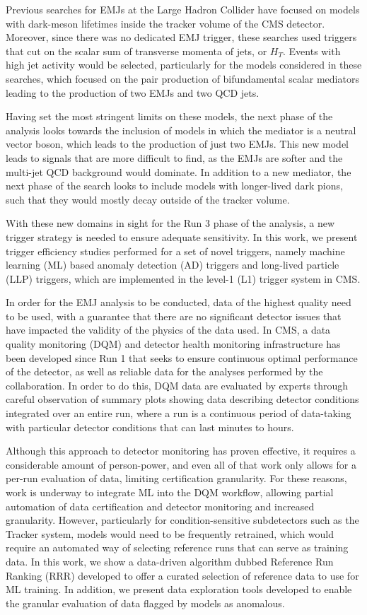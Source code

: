 Previous searches for EMJs at the Large Hadron Collider have focused on models with dark-meson lifetimes inside the tracker volume of the CMS detector. Moreover, since there was no dedicated EMJ trigger, these searches used triggers that cut on the scalar sum of transverse momenta of jets, or $H_T$. Events with high jet activity would be selected, particularly for the models considered in these searches, which focused on the pair production of bifundamental scalar mediators leading to the production of two EMJs and two QCD jets.

Having set the most stringent limits on these models, the next phase of the analysis looks towards the inclusion of models in which the mediator is a neutral vector boson, which leads to the production of just two EMJs. This new model leads to signals that are more difficult to find, as the EMJs are softer and the multi-jet QCD background would dominate. In addition to a new mediator, the next phase of the search looks to include models with longer-lived dark pions, such that they would mostly decay outside of the tracker volume.

With these new domains in sight for the Run 3 phase of the analysis, a new trigger strategy is needed to ensure adequate sensitivity. In this work, we present trigger efficiency studies performed for a set of novel triggers, namely machine learning (ML) based anomaly detection (AD) triggers and long-lived particle (LLP) triggers, which are implemented in the level-1 (L1) trigger system in CMS.

In order for the EMJ analysis to be conducted, data of the highest quality need to be used, with a guarantee that there are no significant detector issues that have impacted the validity of the physics of the data used. In CMS, a data quality monitoring (DQM) and detector health monitoring infrastructure has been developed since Run 1 that seeks to ensure continuous optimal performance of the detector, as well as reliable data for the analyses performed by the collaboration. In order to do this, DQM data are evaluated by experts through careful observation of summary plots showing data describing detector conditions integrated over an entire run, where a run is a continuous period of data-taking with particular detector conditions that can last minutes to hours.

Although this approach to detector monitoring has proven effective, it requires a considerable amount of person-power, and even all of that work only allows for a per-run evaluation of data, limiting certification granularity. For these reasons, work is underway to integrate ML into the DQM workflow, allowing partial automation of data certification and detector monitoring and increased granularity. However, particularly for condition-sensitive subdetectors such as the Tracker system, models would need to be frequently retrained, which would require an automated way of selecting reference runs that can serve as training data. In this work, we show a data-driven algorithm dubbed Reference Run Ranking (RRR) developed to offer a curated selection of reference data to use for ML training. In addition, we present data exploration tools developed to enable the granular evaluation of data flagged by models as anomalous. 

